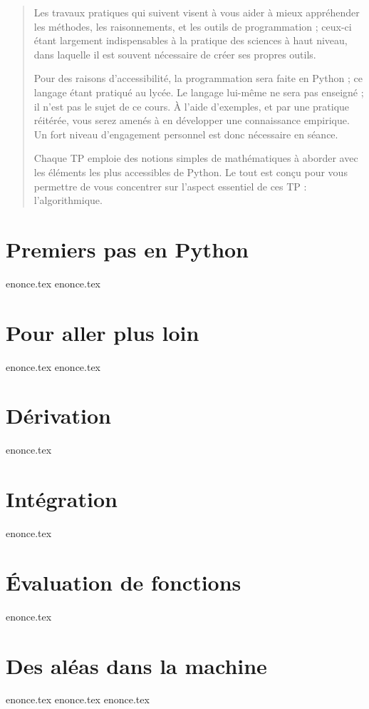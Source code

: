 \documentclass[a4paper,11pt,titlepage]{article}
\begin{document}
\begin{abstract}
Les travaux pratiques qui suivent visent à vous aider à mieux appréhender 
les méthodes, les raisonnements, et les outils de programmation ;
ceux-ci étant largement indispensables à la pratique des sciences à
haut niveau, dans laquelle il est souvent nécessaire
de créer ses propres outils.

Pour des raisons d'accessibilité, la programmation sera faite en Python ;
ce langage étant pratiqué au lycée. Le langage lui-même ne sera pas enseigné ;
il n'est pas le sujet de ce cours.
À l'aide d'exemples, et par une pratique réitérée,
vous serez amenés à en développer une connaissance empirique.
Un fort niveau d'engagement personnel est donc nécessaire en séance.

Chaque TP emploie des notions simples de mathématiques à aborder avec
les éléments les plus accessibles de Python. Le tout est conçu pour vous
permettre de vous concentrer sur l'aspect essentiel de ces TP :
l'algorithmique. 
  
\end{abstract}






\pagebreak
\section{Premiers pas en Python}
{enonce.tex}
\pagebreak
{enonce.tex}

\pagebreak
\section{Pour aller plus loin}
{enonce.tex}
{enonce.tex}
\pagebreak
\section{Dérivation}
{enonce.tex}
\pagebreak
\section{Intégration}
{enonce.tex}
\pagebreak
\section{Évaluation de fonctions}
{enonce.tex}
\pagebreak
\section{Des aléas dans la machine}
{enonce.tex}
\pagebreak
{enonce.tex}
\pagebreak
{enonce.tex}
\end{document}
